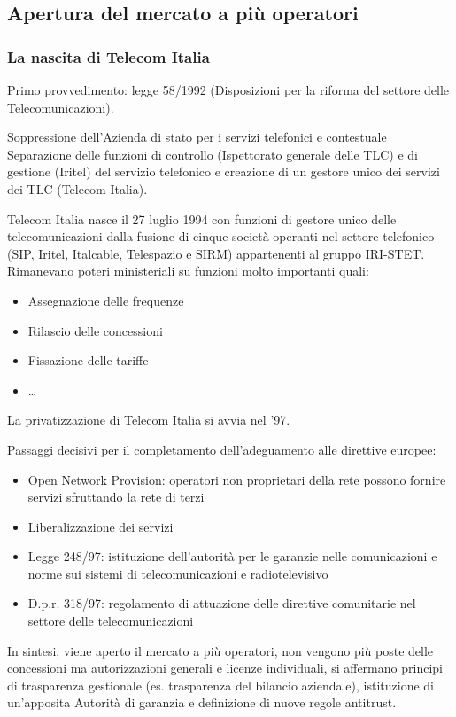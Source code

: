 \subsection{Apertura del mercato a più operatori}

\subsubsection{La nascita di Telecom Italia}
Primo provvedimento: legge 58/1992 (Disposizioni per la riforma del settore delle Telecomunicazioni). 

Soppressione dell'Azienda di stato per i servizi telefonici e contestuale Separazione delle funzioni di controllo (Ispettorato generale delle TLC) e di gestione (Iritel) del servizio telefonico e creazione di un gestore unico dei servizi dei TLC (Telecom Italia).


Telecom Italia nasce il 27 luglio 1994 con funzioni di gestore unico delle telecomunicazioni dalla fusione di cinque società operanti nel settore telefonico (SIP, Iritel, Italcable, Telespazio e SIRM) appartenenti al gruppo IRI-STET. Rimanevano poteri ministeriali su funzioni molto importanti quali:
\begin{itemize}
    \item Assegnazione delle frequenze
    \item Rilascio delle concessioni
    \item Fissazione delle tariffe
    \item \dots
\end{itemize}

La privatizzazione di Telecom Italia si avvia nel '97.

Passaggi decisivi per il completamento dell'adeguamento alle direttive europee:
\begin{itemize}
    \item Open Network Provision: operatori non proprietari della rete possono fornire servizi sfruttando la rete di terzi 
    \item Liberalizzazione dei servizi
    \item Legge 248/97: istituzione dell'autorità per le garanzie nelle comunicazioni e norme sui sistemi di telecomunicazioni e radiotelevisivo
    \item D.p.r. 318/97: regolamento di attuazione delle direttive comunitarie nel settore delle telecomunicazioni
\end{itemize}

In sintesi, viene aperto il mercato a più operatori, non vengono più poste delle concessioni ma autorizzazioni generali e licenze individuali, si affermano principi di trasparenza gestionale (es. trasparenza del bilancio aziendale), istituzione di un'apposita Autorità di garanzia e definizione di nuove regole antitrust.

